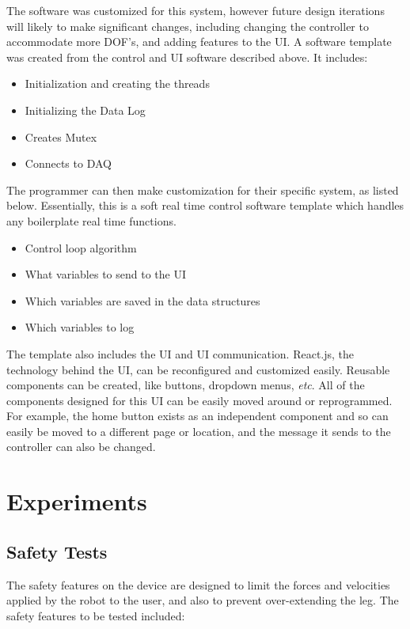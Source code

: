 \documentclass[12pt]{report}
\begin{document}
	The software was customized for this system, however future design iterations will likely to make significant changes, including changing the controller to accommodate more DOF's, and adding features to the UI. A software template was created from the control and UI software described above. It includes:
	
	\begin{itemize}
		\item Initialization and creating the threads
		\item Initializing the Data Log
		\item Creates Mutex
		\item Connects to DAQ
	\end{itemize}
	
	The programmer can then make customization for their specific system, as listed below. Essentially, this is a soft real time control software template which handles any boilerplate real time functions.
	
	\begin{itemize}
		\item Control loop algorithm
		\item What variables to send to the UI
		\item Which variables are saved in the data structures 
		\item Which variables to log 
	\end{itemize}
	
	The template also includes the UI and UI communication. React.js, the technology behind the UI, can be reconfigured and customized easily. Reusable components can be created, like buttons, dropdown menus, \textit{etc}. All of the components designed for this UI can be easily moved around or reprogrammed. For example, the home button exists as an independent component and so can easily be moved to a different page or location, and the message it sends to the controller can also be changed. 
	
\chapter{Experiments}



	\section{Safety Tests}
	
	The safety features on the device are designed to limit the forces and velocities applied by the robot to the user, and also to prevent over-extending the leg. The safety features to be tested included: 
\end{document}
